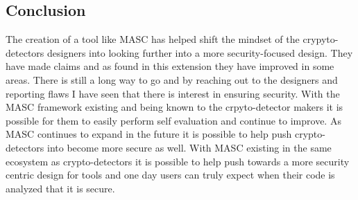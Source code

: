 \subsection{Conclusion}
\label{ch6:sec:conclusion}

The creation of a tool like MASC has helped shift the mindset of the crypyto-detectors designers into looking further into a more security-focused design. They have made claims and as found in this extension they have improved in some areas. There is still a long way to go and by reaching out to the designers and reporting flaws I have seen that there is interest in ensuring security. With the MASC framework existing and being known to the crpyto-detector makers it is possible for them to easily perform self evaluation and continue to improve. As MASC continues to expand in the future it is possible to help push crypto-detectors into become more secure as well. With MASC existing in the same ecosystem as crypto-detectors it is possible to help push towards a more security centric design for tools and one day users can truly expect when their code is analyzed that it is secure.